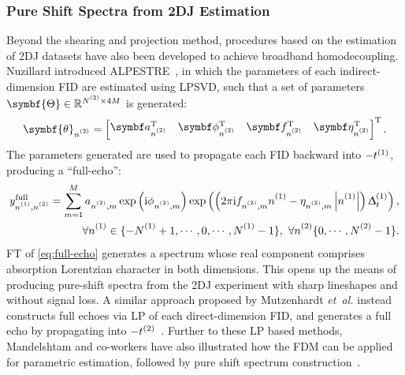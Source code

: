 
\subsubsection{Pure Shift Spectra from 2DJ Estimation}
Beyond the shearing and projection method, procedures based on the estimation
of \ac{2DJ} datasets have also been developed to achieve broadband
homodecoupling. Nuzillard introduced
\ac{ALPESTRE}~\cite{Nuzillard1996,Martinez2012}, in which the parameters of each
indirect-dimension FID are estimated using \ac{LPSVD}, such that a set of
parameters $\symbf{\Theta} \in \mathbb{R}^{\Ntwo \times 4M}$ is generated:
\begin{equation}
    \symbf{\theta}_{\ntwo} =
    \begin{bmatrix}
        \bda_{\ntwo}\T &
        \bdphi_{\ntwo}\T &
        \bdf_{\ntwo}\T &
        \bdeta_{\ntwo}\T
    \end{bmatrix}\T.
\end{equation}
The parameters generated are used to propagate each FID backward into
$-t^{(1)}$, producing a ``full-echo'':
\begin{equation}
    \begin{split}
        y^{\text{full}}_{\none,\ntwo} = \sum_{m=1}^{M}
            a_{\ntwo,m}
            \exp\left(\iu \phi_{\ntwo,m}\right)
            \exp\left(\left(2 \pi \iu f_{\ntwo,m} \none
            -\eta_{\ntwo,m}  \left\lvert \none \right\rvert \right)\Dtone\right), \\
        \forall \none \in \lbrace -\None + 1, \cdots, 0, \cdots, \None - 1 \rbrace,\ \forall \ntwo \lbrace 0, \cdots, \Ntwo - 1 \rbrace.
    \end{split}
    \label{eq:full-echo}
\end{equation}
\ac{FT} of \cref{eq:full-echo} generates a spectrum whose real component
comprises absorption
Lorentzian character in both dimensions. This opens up the means of producing
pure-shift spectra from the \ac{2DJ} experiment with sharp lineshapes and
without signal loss. A similar approach proposed by Mutzenhardt \emph{et~al.}
instead constructs full echoes via \ac{LP} of each direct-dimension
\ac{FID}, and generates a full echo by propagating into
$-t^{(2)}$~\cite{Mutzenhardt1999}. Further to these \ac{LP} based methods,
Mandelshtam and co-workers have also illustrated how the \ac{FDM} can be applied
for parametric estimation, followed by pure shift spectrum
construction~\cite{Mandelshtam1997,Mandelshtam1998}.

